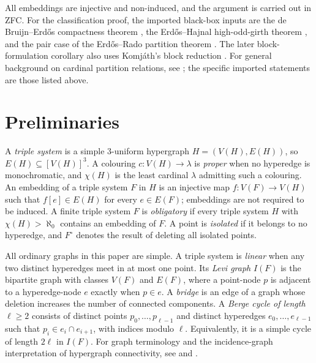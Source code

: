 \documentclass[a4paper,11pt,reqno]{amsart}
\theoremstyle{plain}
\theoremstyle{definition}
\theoremstyle{remark}
\begin{document}
All embeddings are injective and non-induced, and the argument is carried out
in ZFC.  For the classification proof, the imported black-box inputs are the de Bruijn--Erdős
compactness theorem \citep[Theorem~1, pp.~371--373]{debruijn1951}, the
Erdős--Hajnal high-odd-girth theorem
\citep[Theorem~7.4, p.~76]{erdoshajnal1966}, and the pair case of the
Erdős--Rado partition theorem
\citep[Theorem~4(i), formula~(95), p.~471]{erdosrado1956}.
The later block-formulation corollary also uses Komjáth's block reduction
\citep{komjath2001}.
For general background on cardinal partition relations, see
\citet{ehmr1984}; the specific imported statements are those listed above.

\section{Preliminaries}\label{conventions-and-definitions}

A \emph{triple system} is a simple \(3\)-uniform hypergraph \(H=(V(H),E(H))\), so \(E(H)\subseteq[V(H)]^3\). A colouring \(c:V(H)\to\lambda\) is \emph{proper} when no hyperedge is monochromatic, and \(\chi(H)\) is the least cardinal \(\lambda\) admitting such a colouring. An embedding of a triple system \(F\) in \(H\) is an injective map \(f:V(F)\to V(H)\) such that \(f[e]\in E(H)\) for every \(e\in E(F)\); embeddings are not required to be induced. A finite triple system \(F\) is \emph{obligatory} if every triple system \(H\) with \(\chi(H)>\aleph_0\) contains an embedding of \(F\). A point is \emph{isolated} if it belongs to no hyperedge, and \(F^\circ\) denotes the result of deleting all isolated points.

All ordinary graphs in this paper are simple. A triple system is \emph{linear} when any two distinct hyperedges meet in at most one point. Its \emph{Levi graph} \(I(F)\) is the bipartite graph with classes \(V(F)\) and \(E(F)\), where a point-node \(p\) is adjacent to a hyperedge-node \(e\) exactly when \(p\in e\). A \emph{bridge} is an edge of a graph whose deletion increases the number of connected components. A \emph{Berge cycle of length} \(\ell\ge2\) consists of distinct points \(p_0,\ldots,p_{\ell-1}\) and distinct hyperedges \(e_0,\ldots,e_{\ell-1}\) such that \(p_i\in e_i\cap e_{i+1}\), with indices modulo \(\ell\). Equivalently, it is a simple cycle of length \(2\ell\) in \(I(F)\). For graph terminology and the incidence-graph interpretation of hypergraph connectivity, see \citet[Chapters~1 and~3]{diestel2017} and \citet{bahmanian2015}.
\end{document}
